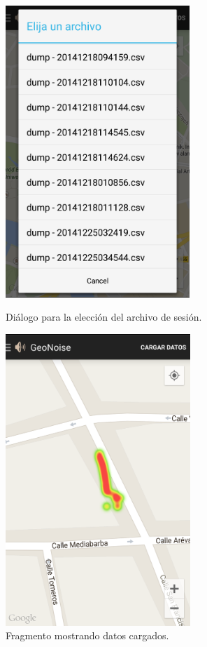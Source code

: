 \begin{figure}[h] \centering%
 \begin{minipage}{0.45\textwidth}\centering%
    \includegraphics[height=11cm]{graphs/filepicker.png} \caption{Diálogo para la elección del archivo de sesión.}\label{fig:screen:filepicker}%
 \end{minipage}
 \hfill
\begin{minipage}{0.45\textwidth}\centering%
 \includegraphics[height=11cm]{graphs/screen_heatmap.png} \caption{Fragmento  mostrando datos cargados.}\label{fig:screen:heatmap}
\end{minipage}
\end{figure}

